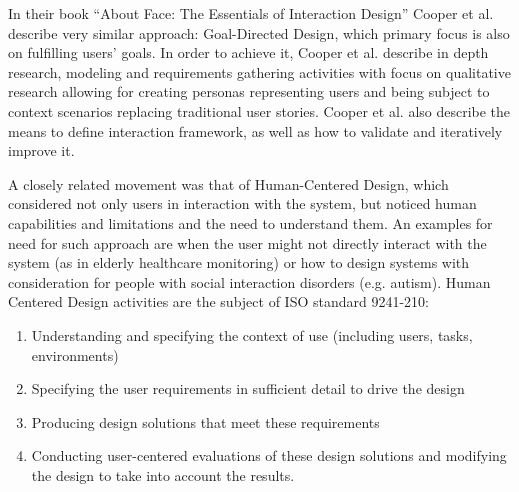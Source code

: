 \documentclass{article}
\begin{document}
In their book ``About Face: The Essentials of Interaction Design'' Cooper et al. \cite{cooper2014face} describe very similar approach: Goal-Directed Design, which primary focus is also on fulfilling users' goals. In order to achieve it, Cooper et al. describe in depth research, modeling and requirements gathering activities with focus on qualitative research allowing for creating personas representing users and being subject to context scenarios replacing traditional user stories. Cooper et al. also describe the means to define interaction framework, as well as how to validate and iteratively improve it.

A closely related movement was that of Human-Centered Design, which considered not only users in interaction with the system, but noticed human capabilities and limitations and the need to understand them. An examples for need for such approach are when the user might not directly interact with the system (as in elderly healthcare monitoring) or how to design systems with consideration for people with social interaction disorders (e.g. autism). Human Centered Design activities are the subject of ISO standard 9241-210:
\begin{enumerate}
  \item Understanding and specifying the context of use (including users, tasks, environments)
  \item Specifying the user requirements in sufficient detail to drive the design
  \item Producing design solutions that meet these requirements
  \item Conducting user-centered evaluations of these design solutions and modifying the design to take into account the results.
\end{enumerate}
\end{document}
